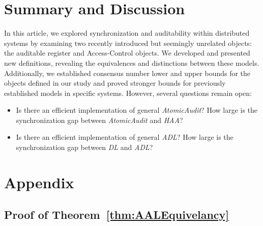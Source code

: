 \documentclass[11pt]{article}
\theoremstyle{definition}
\begin{document}
\section{Summary and Discussion}

In this article, we explored synchronization and auditability within distributed systems by examining two recently introduced but seemingly unrelated objects: the auditable register and Access-Control objects. We developed and presented new definitions, revealing the equivalences and distinctions between these models. Additionally, we established consensus number lower and upper bounds for the objects defined in our study and proved stronger bounds for previously established models in specific systems. However, several questions remain open:
\begin{itemize}
    \item Is there an efficient implementation of general \textit{AtomicAudit}? How large is the synchronization gap between \textit{AtomicAudit} and \textit{HAA}?

\item Is there an efficient implementation of general \textit{ADL}? How large is the synchronization gap between \textit{DL} and \textit{ADL}?
\end{itemize}




\appendix
\section{Appendix}
\subsection{Proof of Theorem~\ref{thm:AALEquivelancy}}
\end{document}
